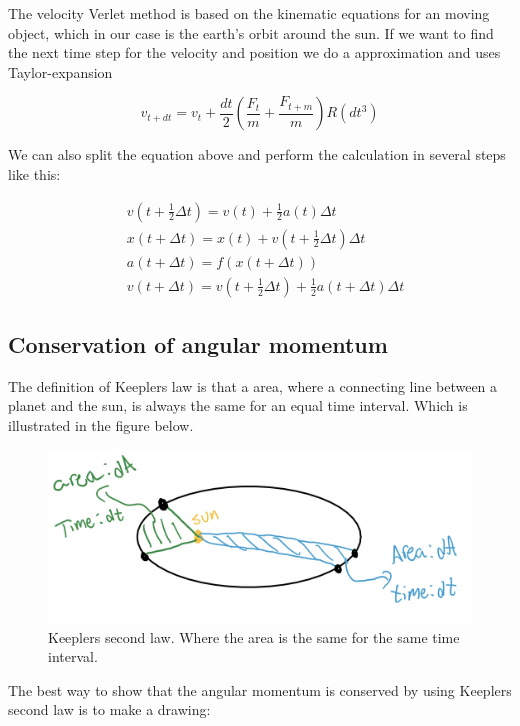 \documentclass{article}
\begin{document}
\begin{multicols}{2}
The velocity Verlet method is based on the kinematic equations for an moving object, which in our case is the earth's orbit around the sun. If we want to find the next time step for the velocity and position we do a approximation and uses Taylor-expansion   

\begin{equation}
v_{t+dt}=v_t +\frac{dt}{2}(\frac{F_t}{m}+\frac{F_{t+m}}{m}) R(dt^3)
\label{eq:steps}
\end{equation}


We can also split the equation above and perform the calculation in several steps like this:

\begin{equation*}
\begin{split}
&v(t+\frac{1}{2}\Delta t)=v(t)+\frac{1}{2}a(t)\Delta t\\
&x(t+\Delta t)=x(t)+v(t+\frac{1}{2}\Delta t)\Delta t\\
&a(t+\Delta t)=f(x(t+\Delta t))\\
&v(t+\Delta t)=v(t+\frac{1}{2}\Delta t)+\frac{1}{2}a(t+\Delta t)\Delta t
\end{split}
\label{eq:steps}
\end{equation*}

\subsection{Conservation of angular momentum}
The definition of Keeplers law is that a area, where a connecting line between a planet and the sun, is always the same for an equal time interval. Which is illustrated in the figure below.

\begin{figure}[H]
	\centering
	\includegraphics[width=\linewidth]{K2L.jpg}
	\caption{Keeplers second law. Where the area is the same for the same time interval.}
	\label{fig:1bplot}
\end{figure}

The best way to show that the angular momentum is conserved by using Keeplers second law is to make a drawing:


\end{multicols}
\end{document}
